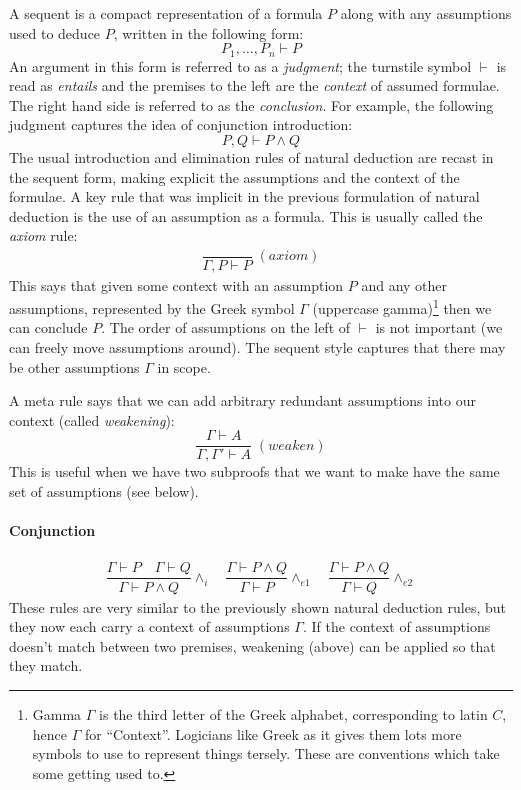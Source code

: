 \documentclass{article}
\theoremstyle{definition}
\begin{document}
A sequent is a compact representation of a formula $P$ along with
any assumptions used to deduce $P$, written in the following form:
%
\begin{equation*}
P_1, \ldots, P_n \vdash P
\end{equation*}
%
An argument in this form is referred to as a \emph{judgment}; the
turnstile symbol $\vdash$ is read as \emph{entails} and the premises
to the left are the \emph{context} of assumed formulae. The right hand
side is referred to as the \emph{conclusion}.  For example, the
following judgment captures the idea of conjunction introduction:
%
\begin{equation*}
P, Q \vdash P \wedge Q
\end{equation*}
%
The usual introduction and elimination rules of natural deduction are
recast in the sequent form, making explicit the assumptions
and the context of the formulae. A key rule that was implicit in the
previous formulation of natural deduction is the use of an assumption
as a formula. This is usually called the \emph{axiom} rule:
%
\begin{align*}
\dfrac{\qquad}{\Gamma, P \vdash P} \; (\textit{axiom})
\end{align*}
%
This says that given some context with an assumption $P$ and any other
assumptions, represented by the Greek symbol $\Gamma$ (uppercase
gamma)\footnote{Gamma $\Gamma$ is the third letter of the Greek
  alphabet, corresponding to latin $C$, hence $\Gamma$ for
  ``Context''. Logicians like Greek as it gives them lots more symbols
  to use to represent things tersely. These are conventions which take
  some getting used to.} then we can conclude $P$.  The order of
assumptions on the left of $\vdash$ is not important (we can freely
move assumptions around).  The sequent style captures that there may
be other assumptions $\Gamma$ in scope.

A meta rule says that we can add arbitrary redundant assumptions into
our context (called \emph{weakening}):
%
\begin{equation*}
  \dfrac{\Gamma \vdash A}
        {\Gamma, \Gamma' \vdash A} \; (\textit{weaken})
  \end{equation*}
This is useful when we have two subproofs that we want to
make have the same set of assumptions (see below).

\paragraph{Conjunction}
%
\begin{align*}
\dfrac{\Gamma \vdash P \quad \Gamma \vdash Q}{\Gamma \vdash P \wedge
  Q} {\wedge_i}
\quad
\dfrac{\Gamma \vdash P \wedge Q}{\Gamma \vdash P} {\wedge_{e1}} 
\quad
\dfrac{\Gamma \vdash P \wedge Q}{\Gamma \vdash Q} {\wedge_{e2}}
\end{align*}
%
These rules are very similar to the previously shown natural
deduction rules, but they now each carry a context of assumptions
$\Gamma$. If the context of assumptions doesn't match between
two premises, weakening (above) can be applied so that they match.
\end{document}
